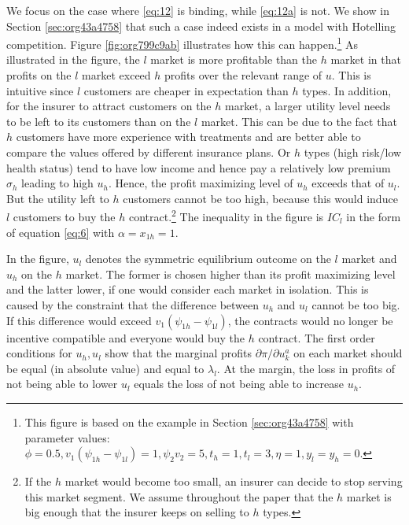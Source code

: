 \documentclass[12pt,english,a4paper]{article}
\begin{document}
We focus on the case where \eqref{eq:12} is binding, while \eqref{eq:12a} is not. We show in Section \ref{sec:org43a4758} that such a case indeed exists in a model with Hotelling competition. Figure \ref{fig:org799c9ab} illustrates how this can happen.\footnote{This figure is based on the example in Section \ref{sec:org43a4758} with parameter values: \(\phi=0.5,v_1(\psi_{1h}-\psi_{1l})=1,\psi_2v_2=5,t_h=1,t_l=3,\eta =1,y_l=y_h=0\).} As illustrated in the figure, the \(l\) market is more profitable than the \(h\) market in that profits on the \(l\) market exceed \(h\) profits over the relevant range of \(u\). This is intuitive since \(l\) customers are cheaper in expectation than \(h\) types. In addition, for the insurer to attract customers on the \(h\) market, a larger utility level needs to be left to its customers than on the \(l\) market. This can be due to the fact that \(h\) customers have more experience with treatments and are better able to compare the values offered by different insurance plans. Or \(h\) types (high risk/low health status) tend to have low income and hence pay a relatively low premium \(\sigma_h\) leading to high \(u_h\). Hence, the profit maximizing level of \(u_h\) exceeds that of \(u_l\). But the utility left to \(h\) customers cannot be too high, because this would induce \(l\) customers to buy the \(h\) contract.\footnote{If the \(h\) market would become too small, an insurer can decide to stop serving this market segment. We assume throughout the paper that the \(h\) market is big enough that the insurer keeps on selling to \(h\) types.} The inequality in the figure is \(IC_l\) in the form of equation \eqref{eq:6} with \(\alpha=x_{1h}=1\).

In the figure, \(u_l\) denotes the symmetric equilibrium outcome on the \(l\) market and \(u_h\) on the \(h\) market. The former is chosen higher than its profit maximizing level and the latter lower, if one would consider each market in isolation. This is caused by the constraint that the difference between \(u_h\) and \(u_l\) cannot be too big. If this difference would exceed \(v_1 (\psi_{1h}-\psi_{1l})\), the contracts would no longer be incentive compatible and everyone would buy the \(h\) contract. The first order conditions for \(u_h,u_l\) show that the marginal profits \(\partial \pi/\partial u_k^a\) on each market should be equal (in absolute value) and equal to \(\lambda_l\). At the margin, the loss in profits of not being able to lower \(u_l\) equals the loss of not being able to increase \(u_h\).
\end{document}

